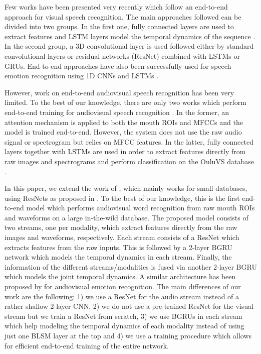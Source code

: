 \documentclass{article}
\begin{document}
Few works have been presented very recently which follow an end-to-end approach for visual speech recognition. The main approaches followed can be divided into two groups. In the first one, fully connected layers are used to extract features and LSTM layers model the temporal dynamics of the sequence \cite{petridis2017deepVisualSpeech,wand2016lipreading}. In the second group, a 3D convolutional layer is used followed either by standard convolutional layers \cite{assael2016lipnet} or residual networks (ResNet) \cite{stafylakis2017combining} combined with LSTMs or GRUs. End-to-end approaches have also been successfully used for speech emotion recognition using 1D CNNs and LSTMs \cite{trigeorgis2016adieu}.

However, work on end-to-end audiovisual speech recognition has been very limited. To the best of our knowledge, there are only two works which perform end-to-end training for audiovisual speech recognition \cite{chung2016lipSentences,end2endAV}. In the former, an attention mechanism is applied to both the mouth ROIs and MFCCs and the model is trained end-to-end. However, the system does not use the raw audio signal or spectrogram but relies on  MFCC features. In the latter, fully connected layers together with LSTMs are used in order to extract features directly from raw images and spectrograms and perform classification on the OuluVS database \cite{Anina2015}.

In this paper, we extend the work of \cite{petridis2017deepVisualSpeech}, which mainly works for small databases, using ResNets as proposed in \cite{stafylakis2017combining}. To the best of our knowledge, this is the first end-to-end model which performs audiovisual word recognition from raw mouth ROIs and waveforms on a large in-the-wild database. The proposed model consists of two streams, one per modality,  which extract features directly from the raw images and waveforms, respectively. Each stream consists of a ResNet which extracts features from the raw inputs. This is followed by a 2-layer BGRU network which models the temporal dynamics in each stream. Finally,  the information of the different streams/modalities is fused  via another 2-layer BGRU which models the joint temporal dynamics. A similar architecture has been proposed by \cite{endtoendtzirakis2017} for audiovisual emotion recognition. The main differences of our work are the following: 1) we use a ResNet for the audio stream instead of a rather shallow 2-layer CNN, 2) we do not use a pre-trained ResNet for the visual stream but we train a ResNet from scratch, 3) we use BGRUs in each stream which help modeling the temporal dynamics of each modality instead of using just one BLSM layer at the top and  4) we use a training procedure which allows for efficient end-to-end training of the entire network.
\end{document}
